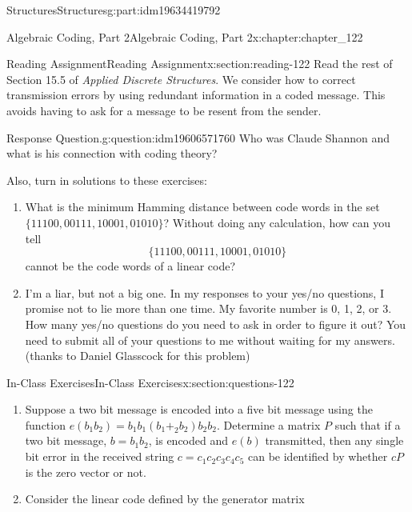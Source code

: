 \documentclass[oneside,10pt,]{book}
\numberwithin{equation}{section}
\begin{document}
\begin{partptx}{Structures}{}{Structures}{}{}{g:part:idm19634419792}
\begin{chapterptx}{Algebraic Coding, Part 2}{}{Algebraic Coding, Part 2}{}{}{x:chapter:chapter_122}
\typeout{************************************************}
%
\begin{sectionptx}{Reading Assignment}{}{Reading Assignment}{}{}{x:section:reading-122}
Read the rest of  Section 15.5 of \emph{Applied Discrete Structures}.  We consider how to correct transmission errors by using redundant information in a coded message.  This avoids having to ask for a message to be resent from the sender.%
\begin{question}{Response Question.}{g:question:idm19606571760}%
Who was Claude Shannon and what is his connection with coding theory?%
\end{question}
Also, turn in solutions to these exercises:%
\begin{enumerate}[label=\arabic*.]
\item{}What is the minimum Hamming distance between code words in the set \(\{11100,00111,10001,01010\}\)?  Without doing any calculation, how can you tell%
\begin{equation*}
\{11100,00111,10001,01010\}
\end{equation*}
cannot be the code words of a linear code?%
\item{}I'm a liar, but not a big one.  In my responses to your yes\slash{}no questions, I promise not to lie more than one time. My favorite number is 0, 1, 2, or 3.  How many yes\slash{}no questions do you need to ask in order to figure it out? You need to submit all of your questions to me without waiting for my answers. (thanks to Daniel Glasscock for this problem)%
%
\end{enumerate}
%
\end{sectionptx}
%
%
\typeout{************************************************}
\typeout{************************************************}
%
\begin{sectionptx}{In-Class Exercises}{}{In-Class Exercises}{}{}{x:section:questions-122}
%
\begin{enumerate}[label=\arabic*.]
\item{}Suppose a two bit message is encoded into a five bit message using the function \(e(b_{1}b_{2})=b_{1}b_{1}(b_{1}+_2 b_{2})b_{2}b_{2}\).  Determine a matrix \(P\) such that if a two bit message, \(b = b_{1}b_{2}\), is encoded and \(e(b)\) transmitted, then any single bit error in the received string \(c=c_{1}c_{2}c_{3}c_{4}c_{5}\) can be identified by whether \(c P\) is the zero vector or not.%
\item{}Consider the  linear code defined by the generator matrix%

\end{enumerate}
\end{sectionptx}
\end{chapterptx}
\end{partptx}
\end{document}
